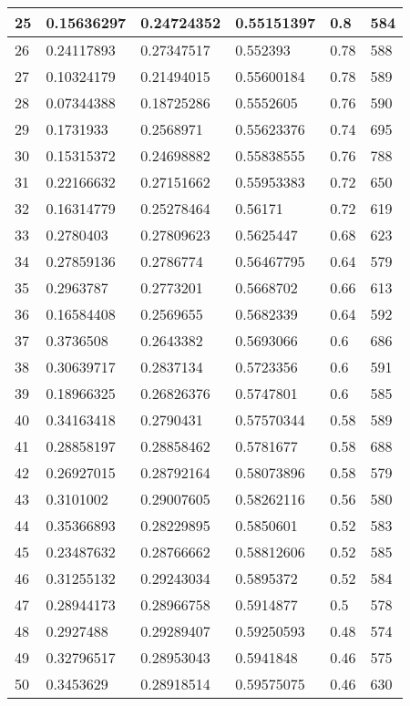 \begin{longtable}{|l|l|l|l|l|l|}
25 & 0.15636297 & 0.24724352 & 0.55151397 & 0.8 & 584 \\ \hline 
26 & 0.24117893 & 0.27347517 & 0.552393 & 0.78 & 588 \\ \hline 
27 & 0.10324179 & 0.21494015 & 0.55600184 & 0.78 & 589 \\ \hline 
28 & 0.07344388 & 0.18725286 & 0.5552605 & 0.76 & 590 \\ \hline 
29 & 0.1731933 & 0.2568971 & 0.55623376 & 0.74 & 695 \\ \hline 
30 & 0.15315372 & 0.24698882 & 0.55838555 & 0.76 & 788 \\ \hline 
31 & 0.22166632 & 0.27151662 & 0.55953383 & 0.72 & 650 \\ \hline 
32 & 0.16314779 & 0.25278464 & 0.56171 & 0.72 & 619 \\ \hline 
33 & 0.2780403 & 0.27809623 & 0.5625447 & 0.68 & 623 \\ \hline 
34 & 0.27859136 & 0.2786774 & 0.56467795 & 0.64 & 579 \\ \hline 
35 & 0.2963787 & 0.2773201 & 0.5668702 & 0.66 & 613 \\ \hline 
36 & 0.16584408 & 0.2569655 & 0.5682339 & 0.64 & 592 \\ \hline 
37 & 0.3736508 & 0.2643382 & 0.5693066 & 0.6 & 686 \\ \hline 
38 & 0.30639717 & 0.2837134 & 0.5723356 & 0.6 & 591 \\ \hline 
39 & 0.18966325 & 0.26826376 & 0.5747801 & 0.6 & 585 \\ \hline 
40 & 0.34163418 & 0.2790431 & 0.57570344 & 0.58 & 589 \\ \hline 
41 & 0.28858197 & 0.28858462 & 0.5781677 & 0.58 & 688 \\ \hline 
42 & 0.26927015 & 0.28792164 & 0.58073896 & 0.58 & 579 \\ \hline 
43 & 0.3101002 & 0.29007605 & 0.58262116 & 0.56 & 580 \\ \hline 
44 & 0.35366893 & 0.28229895 & 0.5850601 & 0.52 & 583 \\ \hline 
45 & 0.23487632 & 0.28766662 & 0.58812606 & 0.52 & 585 \\ \hline 
46 & 0.31255132 & 0.29243034 & 0.5895372 & 0.52 & 584 \\ \hline 
47 & 0.28944173 & 0.28966758 & 0.5914877 & 0.5 & 578 \\ \hline 
48 & 0.2927488 & 0.29289407 & 0.59250593 & 0.48 & 574 \\ \hline 
49 & 0.32796517 & 0.28953043 & 0.5941848 & 0.46 & 575 \\ \hline 
50 & 0.3453629 & 0.28918514 & 0.59575075 & 0.46 & 630 \\ \hline 
\end{longtable}
